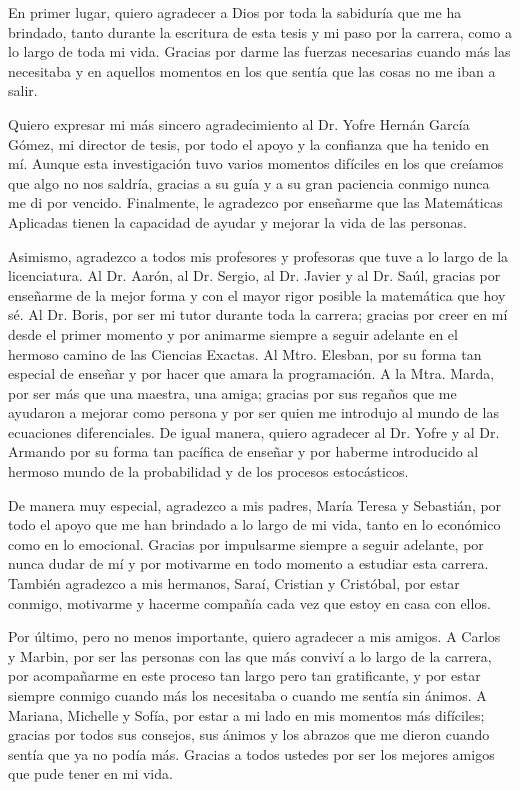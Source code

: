 \documentclass[
  spanish,
  us-letterpaper,
]{scrreprt}
\numberwithin{equation}{section}
\theoremstyle{plain}
\theoremstyle{plain}
\theoremstyle{definition}
\theoremstyle{plain}
\theoremstyle{remark}
\begin{document}
En primer lugar, quiero agradecer a Dios por toda la sabiduría que me ha brindado, tanto durante la escritura de esta tesis y mi paso por la carrera, como a lo largo de toda mi vida. Gracias por darme las fuerzas necesarias cuando más las necesitaba y en aquellos momentos en los que sentía que las cosas no me iban a salir.

Quiero expresar mi más sincero agradecimiento al Dr. Yofre Hernán García Gómez, mi director de tesis, por todo el apoyo y la confianza que ha tenido en mí. Aunque esta investigación tuvo varios momentos difíciles en los que creíamos que algo no nos saldría, gracias a su guía y a su gran paciencia conmigo nunca me di por vencido. Finalmente, le agradezco por enseñarme que las Matemáticas Aplicadas tienen la capacidad de ayudar y mejorar la vida de las personas.

Asimismo, agradezco a todos mis profesores y profesoras que tuve a lo largo de la licenciatura. Al Dr. Aarón, al Dr. Sergio, al Dr. Javier y al Dr. Saúl, gracias por enseñarme de la mejor forma y con el mayor rigor posible la matemática que hoy sé. Al Dr. Boris, por ser mi tutor durante toda la carrera; gracias por creer en mí desde el primer momento y por animarme siempre a seguir adelante en el hermoso camino de las Ciencias Exactas. Al Mtro. Elesban, por su forma tan especial de enseñar y por hacer que amara la programación. A la Mtra. Marda, por ser más que una maestra, una amiga; gracias por sus regaños que me ayudaron a mejorar como persona y por ser quien me introdujo al mundo de las ecuaciones diferenciales. De igual manera, quiero agradecer al Dr. Yofre y al Dr. Armando por su forma tan pacífica de enseñar y por haberme introducido al hermoso mundo de la probabilidad y de los procesos estocásticos.

De manera muy especial, agradezco a mis padres, María Teresa y Sebastián, por todo el apoyo que me han brindado a lo largo de mi vida, tanto en lo económico como en lo emocional. Gracias por impulsarme siempre a seguir adelante, por nunca dudar de mí y por motivarme en todo momento a estudiar esta carrera. También agradezco a mis hermanos, Saraí, Cristian y Cristóbal, por estar conmigo, motivarme y hacerme compañía cada vez que estoy en casa con ellos.

Por último, pero no menos importante, quiero agradecer a mis amigos. A Carlos y Marbin, por ser las personas con las que más conviví a lo largo de la carrera, por acompañarme en este proceso tan largo pero tan gratificante, y por estar siempre conmigo cuando más los necesitaba o cuando me sentía sin ánimos. A Mariana, Michelle y Sofía, por estar a mi lado en mis momentos más difíciles; gracias por todos sus consejos, sus ánimos y los abrazos que me dieron cuando sentía que ya no podía más. Gracias a todos ustedes por ser los mejores amigos que pude tener en mi vida.
\end{document}
